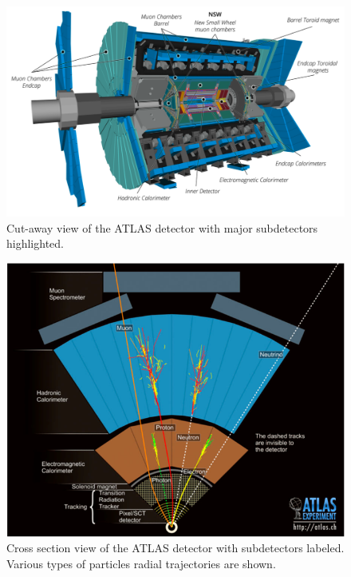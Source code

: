 	\begin{figure}[!ht]
	\centering
	\includegraphics[width=.75\textwidth,keepaspectratio=true]{chapters/chapter2_experiment/images/ATLAS_3d_run3.png}
	\caption{ Cut-away view of the ATLAS detector with major subdetectors highlighted.}
	\label{fig:ATLAS}
	\end{figure}

	\begin{figure}[!ht]
	\centering
	\includegraphics[width=.65\textwidth,keepaspectratio=true]{chapters/chapter2_experiment/images/ATLASCrossSectionDiagram.png}
	\caption{ Cross section view of the ATLAS detector with subdetectors labeled. Various types of particles radial trajectories are shown.}
	\label{fig:ATLAS-XSec}
	\end{figure}

